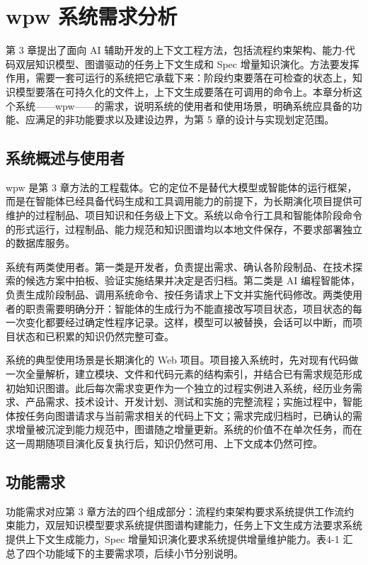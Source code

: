 \chapter{wpw 系统需求分析}

第 3 章提出了面向 AI 辅助开发的上下文工程方法，包括流程约束架构、能力-代码双层知识模型、图谱驱动的任务上下文生成和 Spec 增量知识演化。方法要发挥作用，需要一套可运行的系统把它承载下来：阶段约束要落在可检查的状态上，知识模型要落在可持久化的文件上，上下文生成要落在可调用的命令上。本章分析这个系统——wpw——的需求，说明系统的使用者和使用场景，明确系统应具备的功能、应满足的非功能要求以及建设边界，为第 5 章的设计与实现划定范围。


\section{系统概述与使用者}
wpw 是第 3 章方法的工程载体。它的定位不是替代大模型或智能体的运行框架，而是在智能体已经具备代码生成和工具调用能力的前提下，为长期演化项目提供可维护的过程制品、项目知识和任务级上下文。系统以命令行工具和智能体阶段命令的形式运行，过程制品、能力规范和知识图谱均以本地文件保存，不要求部署独立的数据库服务。

系统有两类使用者。第一类是开发者，负责提出需求、确认各阶段制品、在技术探索的候选方案中拍板、验证实施结果并决定是否归档。第二类是 AI 编程智能体，负责生成阶段制品、调用系统命令、按任务请求上下文并实施代码修改。两类使用者的职责需要明确分开：智能体的生成行为不能直接改写项目状态，项目状态的每一次变化都要经过确定性程序记录。这样，模型可以被替换，会话可以中断，而项目状态和已积累的知识仍然完整可查。

系统的典型使用场景是长期演化的 Web 项目。项目接入系统时，先对现有代码做一次全量解析，建立模块、文件和代码元素的结构索引，并结合已有需求规范形成初始知识图谱。此后每次需求变更作为一个独立的过程实例进入系统，经历业务需求、产品需求、技术设计、开发计划、测试和实施的完整流程；实施过程中，智能体按任务向图谱请求与当前需求相关的代码上下文；需求完成归档时，已确认的需求增量被沉淀到能力规范中，图谱随之增量更新。系统的价值不在单次任务，而在这一周期随项目演化反复执行后，知识仍然可用、上下文成本仍然可控。


\section{功能需求}
功能需求对应第 3 章方法的四个组成部分：流程约束架构要求系统提供工作流约束能力，双层知识模型要求系统提供图谱构建能力，任务上下文生成方法要求系统提供上下文生成能力，Spec 增量知识演化要求系统提供增量维护能力。表4-1 汇总了四个功能域下的主要需求项，后续小节分别说明。

